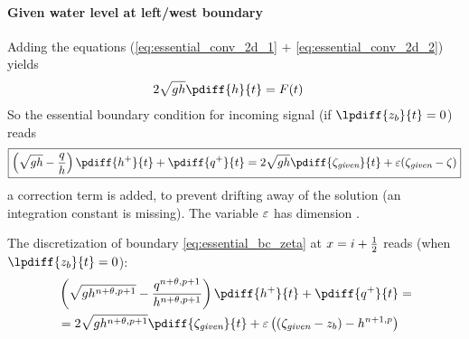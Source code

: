 \paragraph*{Given water level at left/west boundary}


Adding the equations (\eqref{eq:essential_conv_2d_1} $+$ \eqref{eq:essential_conv_2d_2}) yields
\begin{align}
    2 \sqrt{gh} \pdiff{h}{t} & = F(t)
\end{align}
%
So the essential boundary condition for incoming signal (if $\lpdiff{z_b}{t} = 0$) reads
\begin{align}
    {\boxed{
            \left(\sqrt{gh} - \frac{q}{h}\right) \pdiff{h^{+}}{t} + \pdiff{q^{+}}{t}  = 2 \sqrt{gh} \pdiff{\zeta_{\textit{given}}}{t}  + \eps(\zeta_{\textit{given}} - \zeta)
    }}\label{eq:essential_bc_2d_zeta}
\end{align}
a correction term is added, to prevent drifting away of the solution (an integration constant is missing).
The variable $\varepsilon$ has dimension \bunit{\metre\per\square\second}.

The discretization of  boundary \autoref{eq:essential_bc_zeta} at $x=i+\frac{1}{2}$ reads (when $\lpdiff{z_b}{t}=0$):
\begin{align}
    &\left(\sqrt{gh^{n+\theta,p+1}} - \frac{q^{n+\theta,p+1}}{h^{n+\theta,p+1}}\right) \pdiff{h^{+}}{t} + \pdiff{q^{+}}{t}  =
    \nonumber \\*
    & = 2 \sqrt{gh^{n+\theta,p+1}} \pdiff{\zeta_{\textit{given}}}{t}
    + \eps \left( (\zeta_{\textit{given}} -z_b) - h^{n+1,p}   \right)
\end{align}
